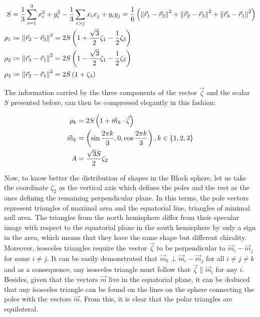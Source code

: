\begin{align*}
S &= \frac{1}{3}\sum_{i=1}^3 x_i^2 + y_i^2 -\frac{1}{3}\sum_{i > j} x_ix_j + y_iy_j  = \frac{1}{6}\left( \left\lVert \vec{r}_1 -\vec{r}_2 \right\rVert^2+\left\lVert \vec{r}_2 -\vec{r}_3 \right\rVert^2+\left\lVert \vec{r}_3 -\vec{r}_1 \right\rVert^2 \right)\\
\rho_1 &\coloneqq \left\lVert \vec{r}_2 -\vec{r}_3 \right\rVert^2 = 2S\left( 1+\frac{\sqrt{3}}{2}\zeta_1-\frac{1}{2}\zeta_3 \right) \\
\rho_2 &\coloneqq \left\lVert \vec{r}_3 -\vec{r}_1 \right\rVert^2 = 2S\left( 1-\frac{\sqrt{3}}{2}\zeta_1-\frac{1}{2}\zeta_3 \right) \\
\rho_3 &\coloneqq \left\lVert \vec{r}_2 -\vec{r}_1 \right\rVert^2 = 2S\left( 1+\zeta_3 \right)
\end{align*}

The information carried by the three components of the vector $\vec{\zeta}$ and the scalar $S$ presented before, can then be compressed elegantly in this fashion:

\begin{equation}
\begin{aligned}
\rho_k &= 2S\left( 1+\vec{m}_k\cdot\vec{\zeta} \right)\\
\vec{m}_k &= \left( \sin{\frac{2\pi k}{3}},0,\cos{\frac{2\pi k}{3}} \right), k \in \left\lbrace 1,2, 3 \right\rbrace\\
A &= \frac{\sqrt{3}S}{2} \zeta_2
\end{aligned}
\label{eq:compressed}
\end{equation}

Now, to know better the distribution of shapes in the Bloch sphere, let us take the coordinate $\zeta_2$ as the vertical axis which defines the poles and the rest as the ones defining the remaining perpendicular plane. In this terms, the pole vectors represent triangles of maximal area and the equatorial line, triangles of minimal null area. The triangles from the north hemisphere differ from their specular image with respect to the equatorial plane in the south hemisphere by only a sign in the area, which means that they have the same shape but different chirality.\\

Moreover, isosceles triangles require the vector $\vec{\zeta}$ to be perpendicular to $\vec{m}_i-\vec{m}_j$ for some $i \neq j$. It can be easily demonstrated that $\vec{m}_k \perp \vec{m}_i-\vec{m}_j$ for all $i \neq j \neq k$ and as a consequence, any isosceles triangle must follow that $\vec{\zeta}\parallel\vec{m}_i$ for any $i$. Besides, given that the vectors $\vec{m}$ live in the equatorial plane, it can be deduced that any isosceles triangle can be found on the lines on the sphere connecting the poles with the vectors $\vec{m}$. From this, it is clear that the polar triangles are equilateral.\\

